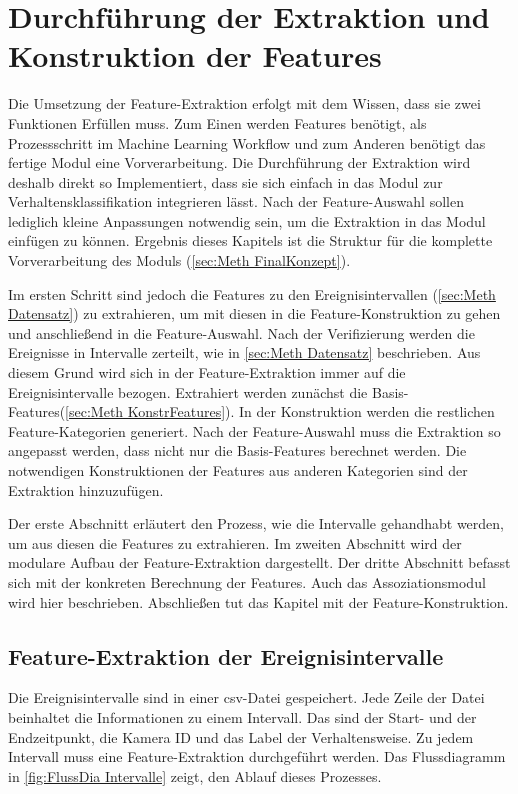  \section{Durchführung der Extraktion und Konstruktion der Features} \label{secc:Umsetz Featextr}
Die Umsetzung der Feature-Extraktion erfolgt mit dem Wissen, dass sie zwei Funktionen Erfüllen muss. Zum Einen werden Features benötigt, als Prozessschritt im Machine Learning Workflow und zum Anderen benötigt das fertige Modul eine Vorverarbeitung. Die Durchführung der Extraktion wird deshalb direkt so Implementiert, dass sie sich einfach in das Modul zur Verhaltensklassifikation integrieren lässt. Nach der Feature-Auswahl sollen lediglich kleine Anpassungen notwendig sein, um die Extraktion in das Modul einfügen zu können. Ergebnis dieses Kapitels ist die Struktur für die komplette Vorverarbeitung des Moduls (\ref{sec:Meth FinalKonzept}).\par

Im ersten Schritt sind jedoch die Features zu den Ereignisintervallen (\ref{sec:Meth Datensatz}) zu extrahieren, um mit diesen in die Feature-Konstruktion zu gehen und anschließend in die Feature-Auswahl. Nach der Verifizierung werden die Ereignisse in Intervalle zerteilt, wie in \ref{sec:Meth Datensatz} beschrieben. Aus diesem Grund wird sich in der Feature-Extraktion immer auf die Ereignisintervalle bezogen. Extrahiert werden zunächst die Basis-Features(\ref{sec:Meth KonstrFeatures}). In der Konstruktion werden die restlichen Feature-Kategorien generiert. Nach der Feature-Auswahl muss die Extraktion so angepasst werden, dass nicht nur die Basis-Features berechnet werden. Die notwendigen Konstruktionen der Features aus anderen Kategorien sind der Extraktion hinzuzufügen. \par

Der erste Abschnitt erläutert den Prozess, wie die Intervalle gehandhabt werden, um aus diesen die Features zu extrahieren. Im zweiten Abschnitt wird der modulare Aufbau der Feature-Extraktion dargestellt. Der dritte Abschnitt befasst sich mit der konkreten Berechnung der Features. Auch das Assoziationsmodul wird hier beschrieben. Abschließen tut das Kapitel mit der Feature-Konstruktion. 



\subsection{Feature-Extraktion der Ereignisintervalle} \label{sec:Umse ExtrIntervalls}
Die Ereignisintervalle sind in einer csv-Datei gespeichert. Jede Zeile der Datei beinhaltet die Informationen zu einem Intervall. Das sind der Start- und der Endzeitpunkt, die Kamera ID und das Label der Verhaltensweise. Zu jedem Intervall muss eine Feature-Extraktion durchgeführt werden. Das Flussdiagramm in \ref{fig:FlussDia Intervalle} zeigt, den Ablauf dieses Prozesses.

